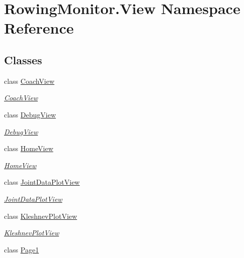 \hypertarget{namespace_rowing_monitor_1_1_view}{}\section{Rowing\+Monitor.\+View Namespace Reference}
\label{namespace_rowing_monitor_1_1_view}
\subsection*{Classes}
\begin{DoxyCompactItemize}
\item 
class \hyperlink{class_rowing_monitor_1_1_view_1_1_coach_view}{Coach\+View}
\begin{DoxyCompactList}\small\item\em \hyperlink{class_rowing_monitor_1_1_view_1_1_coach_view}{Coach\+View} \end{DoxyCompactList}\item 
class \hyperlink{class_rowing_monitor_1_1_view_1_1_debug_view}{Debug\+View}
\begin{DoxyCompactList}\small\item\em \hyperlink{class_rowing_monitor_1_1_view_1_1_debug_view}{Debug\+View} \end{DoxyCompactList}\item 
class \hyperlink{class_rowing_monitor_1_1_view_1_1_home_view}{Home\+View}
\begin{DoxyCompactList}\small\item\em \hyperlink{class_rowing_monitor_1_1_view_1_1_home_view}{Home\+View} \end{DoxyCompactList}\item 
class \hyperlink{class_rowing_monitor_1_1_view_1_1_joint_data_plot_view}{Joint\+Data\+Plot\+View}
\begin{DoxyCompactList}\small\item\em \hyperlink{class_rowing_monitor_1_1_view_1_1_joint_data_plot_view}{Joint\+Data\+Plot\+View} \end{DoxyCompactList}\item 
class \hyperlink{class_rowing_monitor_1_1_view_1_1_kleshnev_plot_view}{Kleshnev\+Plot\+View}
\begin{DoxyCompactList}\small\item\em \hyperlink{class_rowing_monitor_1_1_view_1_1_kleshnev_plot_view}{Kleshnev\+Plot\+View} \end{DoxyCompactList}\item 
class \hyperlink{class_rowing_monitor_1_1_view_1_1_page1}{Page1}

\end{DoxyCompactItemize}

